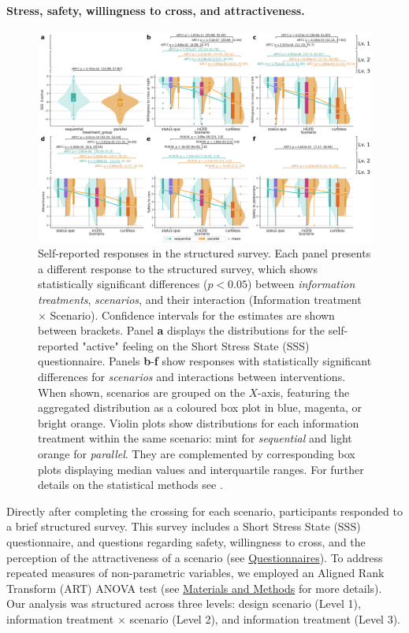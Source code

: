 \paragraph{Stress, safety, willingness to cross, and attractiveness.} 
\begin{figure}[hbt!]
\centering
\includegraphics[width=\linewidth]{violin_plots_significant_structured_responses_v10.jpg}
\caption{Self-reported responses in the structured survey. Each panel presents a different response to the structured survey, which shows statistically significant differences ($p<0.05$) between \emph{information treatments}, \emph{scenarios}, and their interaction (Information treatment $\times$ Scenario). Confidence intervals for the estimates are shown between brackets.  
Panel \textbf{a} displays the distributions for the self-reported "active" feeling on the Short Stress State (SSS) questionnaire.
Panels \textbf{b}-\textbf{f} show responses with statistically significant differences for \emph{scenarios} and interactions between interventions. When shown, scenarios are grouped on the $X$-axis, featuring the aggregated distribution as a coloured box plot in blue, magenta, or bright orange. Violin plots show distributions for each information treatment within the same scenario: mint for \emph{sequential} and light orange for \emph{parallel}. They are complemented by corresponding box plots displaying median values and interquartile ranges. For further details on the statistical methods see .
}
\label{fig:violin_sign_structured_survey}
\end{figure}

Directly after completing the crossing for each scenario, participants responded to a brief structured survey. This survey includes a Short Stress State (SSS) \cite{helton2004validation} questionnaire, and questions regarding safety, willingness to cross, and the perception of the attractiveness of a scenario (see \hyperref[apx:quest]{Questionnaires}).
To address repeated measures of non-parametric variables, we employed an Aligned Rank Transform (ART) ANOVA test \cite{Wobbrock2011} (see \hyperref[sec:MaterialsAndMethods]{Materials and Methods} for more details). 
Our analysis was structured across three levels: design scenario (Level 1), information treatment $\times$ scenario (Level 2), and information treatment (Level 3).

